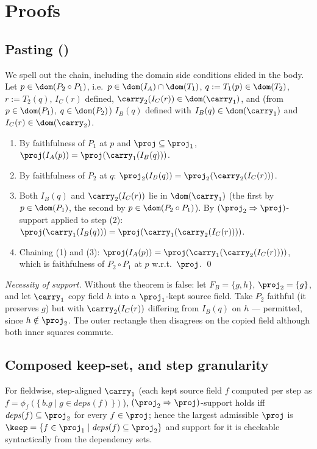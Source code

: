 \section{Proofs}
\label{app:proofs}

\subsection{Pasting ()}

We spell out the chain, including the domain side conditions elided in
the body. Let $p \in \dom(P_2 \circ P_1)$, i.e.\
$p \in \dom(I_A) \cap \dom(T_1)$, $q := T_1(p) \in \dom(T_2)$,
$r := T_2(q)$, $I_C(r)$ defined,
$\carry_2(I_C(r)) \in \dom(\carry_1)$, and (from $p \in \dom(P_1)$,
$q \in \dom(P_2)$) $I_B(q)$ defined with
$I_B(q) \in \dom(\carry_1)$ and $I_C(r) \in \dom(\carry_2)$.

\begin{enumerate}
\item By faithfulness of $P_1$ at $p$ and $\proj \subseteq \proj_1$,
  $\proj(I_A(p)) = \proj(\carry_1(I_B(q)))$.
\item By faithfulness of $P_2$ at $q$:
  $\proj_2(I_B(q)) = \proj_2(\carry_2(I_C(r)))$.
\item Both $I_B(q)$ and $\carry_2(I_C(r))$ lie in $\dom(\carry_1)$ (the
  first by $p \in \dom(P_1)$, the second by
  $p \in \dom(P_2 \circ P_1)$). By
  $(\proj_2 \Rightarrow \proj)$-support applied to step (2):
  $\proj(\carry_1(I_B(q))) = \proj(\carry_1(\carry_2(I_C(r))))$.
\item Chaining (1) and (3):
  $\proj(I_A(p)) = \proj(\carry_1(\carry_2(I_C(r))))$, which is
  faithfulness of $P_2 \circ P_1$ at $p$ w.r.t.\ $\proj$. \qed
\end{enumerate}

\emph{Necessity of support.} Without  the theorem is
false: let $F_B = \{g, h\}$, $\proj_2 = \{g\}$, and let $\carry_1$ copy
field $h$ into a $\proj_1$-kept source field. Take $P_2$ faithful (it
preserves $g$) but with $\carry_2(I_C(r))$ differing from $I_B(q)$ on
$h$ --- permitted, since $h \notin \proj_2$. The outer rectangle then
disagrees on the copied field although both inner squares commute.

\subsection{Composed keep-set, and step granularity}

For fieldwise, step-aligned $\carry_1$ (each kept source field $f$
computed per step as $f = \phi_f(\{\,b.g \mid g \in \mathit{deps}(f)\,\})$),
$(\proj_2 \Rightarrow \proj)$-support holds iff
$\mathit{deps}(f) \subseteq \proj_2$ for every $f \in \proj$; hence the
largest admissible $\proj$ is
$\keep = \{ f \in \proj_1 \mid \mathit{deps}(f) \subseteq \proj_2 \}$ and
support for it is checkable syntactically from the dependency sets.


